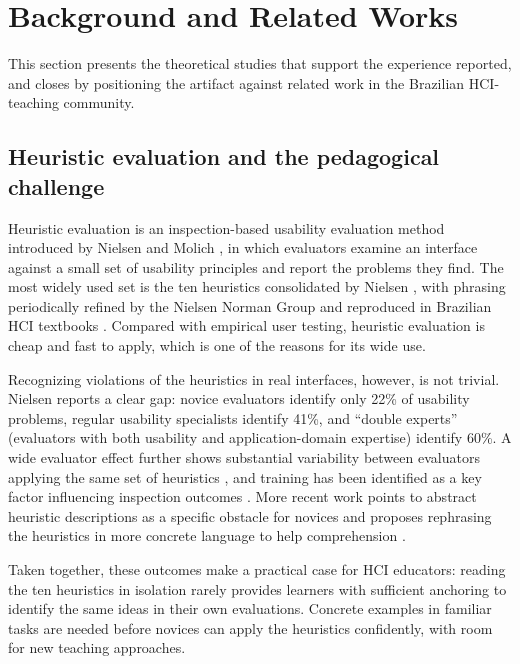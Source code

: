 \section{Background and Related Works}
\label{sec:background}

This section presents the theoretical studies that support the experience reported, and closes by positioning the artifact against related work in the Brazilian HCI-teaching community.

\subsection{Heuristic evaluation and the pedagogical challenge}

Heuristic evaluation is an inspection-based usability evaluation method introduced by Nielsen and Molich \cite{nielsen1990heuristic}, in which evaluators examine an interface against a small set of usability principles and report the problems they find. The most widely used set is the ten heuristics consolidated by Nielsen \cite{nielsen1994heuristic}, with phrasing periodically refined by the Nielsen Norman Group \cite{nielsen2024tenheuristics} and reproduced in Brazilian HCI textbooks \cite{barbosa2010interacao, BarbosaEtAl_Livro2021}. Compared with empirical user testing, heuristic evaluation is cheap and fast to apply, which is one of the reasons for its wide use.

Recognizing violations of the heuristics in real interfaces, however, is not trivial. Nielsen \cite{nielsen1992finding} reports a clear gap: novice evaluators identify only 22\% of usability problems, regular usability specialists identify 41\%, and ``double experts'' (evaluators with both usability and application-domain expertise) identify 60\%. A wide evaluator effect further shows substantial variability between evaluators applying the same set of heuristics \cite{hertzum2003evaluator}, and training has been identified as a key factor influencing inspection outcomes \cite{hvannberg2007heuristic}. More recent work points to abstract heuristic descriptions as a specific obstacle for novices and proposes rephrasing the heuristics in more concrete language to help comprehension \cite{abulfaraj2020detailed}.

Taken together, these outcomes make a practical case for HCI educators: reading the ten heuristics in isolation rarely provides learners with sufficient anchoring to identify the same ideas in their own evaluations. Concrete examples in familiar tasks are needed before novices can apply the heuristics confidently, with room for new teaching approaches.

